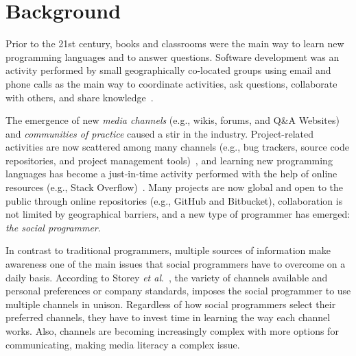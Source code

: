 \documentclass{sig-alternate-05-2015}
\begin{document}
\section{Background}
\label{cha:background}
	Prior to the 21st century, books and classrooms were the main way to learn new programming languages and to answer questions.
	Software development was an activity performed by small geographically co-located groups using email and phone calls as the main way to coordinate activities, ask questions, collaborate with others, and share knowledge~\cite{Storey2014}.

	The emergence of new \textit{media channels} (e.g., wikis, forums, and Q\&A Websites) and \textit{communities of practice} caused a stir in the industry.  
	Project-related activities are now scattered among many channels (e.g., bug trackers, source code repositories, and project management tools)~\cite{Guzzi2013}, and learning new programming languages has become a just-in-time activity performed with the help of online resources (e.g., Stack Overflow)~\cite{Sim2013,Storey2010,Hartmann2008}.
	Many projects are now global and open to the public through online repositories (e.g., GitHub and  Bitbucket), collaboration is not limited by geographical barriers, and a new type of programmer has emerged: \textit{the social programmer}. 

	In contrast to traditional programmers, multiple sources of information make awareness one of the main issues that social programmers have to overcome on a daily basis.
	According to Storey \textit{et al}.~\cite{Storey2010, Storey2014}, the variety of channels available and personal preferences or company standards, imposes the social programmer to use multiple channels in unison.
	Regardless of how social programmers select their preferred channels, they have to invest time in learning the way each channel works.
	Also, channels are becoming increasingly complex with more options for communicating, making media literacy a complex issue.
\end{document}
